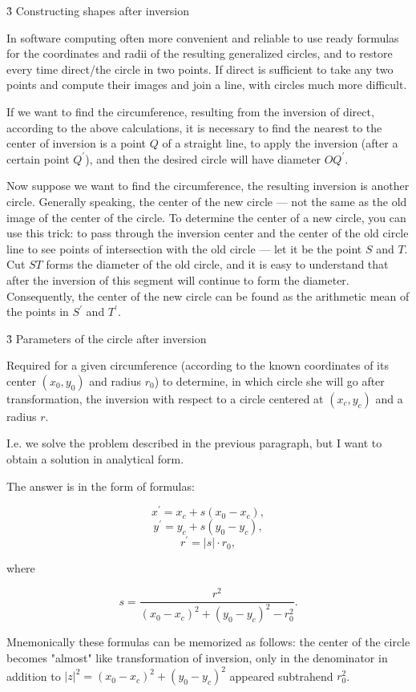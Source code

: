 \h3{ Constructing shapes after inversion }

In software computing often more convenient and reliable to use ready formulas for the coordinates and radii of the resulting generalized circles, and to restore every time direct/the circle in two points. If direct is sufficient to take any two points and compute their images and join a line, with circles much more difficult.

If we want to find the circumference, resulting from the inversion of direct, according to the above calculations, it is necessary to find the nearest to the center of inversion is a point $Q$ of a straight line, to apply the inversion (after a certain point $Q^\prime$), and then the desired circle will have diameter $O Q^\prime$.

Now suppose we want to find the circumference, the resulting inversion is another circle. Generally speaking, the center of the new circle --- not the same as the old image of the center of the circle. To determine the center of a new circle, you can use this trick: to pass through the inversion center and the center of the old circle line to see points of intersection with the old circle --- let it be the point $S$ and $T$. Cut $ST$ forms the diameter of the old circle, and it is easy to understand that after the inversion of this segment will continue to form the diameter. Consequently, the center of the new circle can be found as the arithmetic mean of the points in $S^\prime$ and $T^\prime$.


\h3{ Parameters of the circle after inversion }

Required for a given circumference (according to the known coordinates of its center $(x_0,y_0)$ and radius $r_0$) to determine, in which circle she will go after transformation, the inversion with respect to a circle centered at $(x_c,y_c)$ and a radius $r$.

I.e. we solve the problem described in the previous paragraph, but I want to obtain a solution in analytical form.

The answer is in the form of formulas:

$$ x^\prime = x_c + s (x_0 - x_c), $$
$$ y^\prime = y_c + s (y_0 - y_c), $$
$$ r^\prime = |s| \cdot r_0, $$

where

$$ s = \frac{ r^2 }{ (x_0 - x_c)^2 + (y_0 - y_c)^2 - r_0^2 }. $$

Mnemonically these formulas can be memorized as follows: the center of the circle becomes "almost" like transformation of inversion, only in the denominator in addition to $|z|^2 = (x_0 - x_c)^2 + (y_0 - y_c)^2$ appeared subtrahend $r_0^2$.

